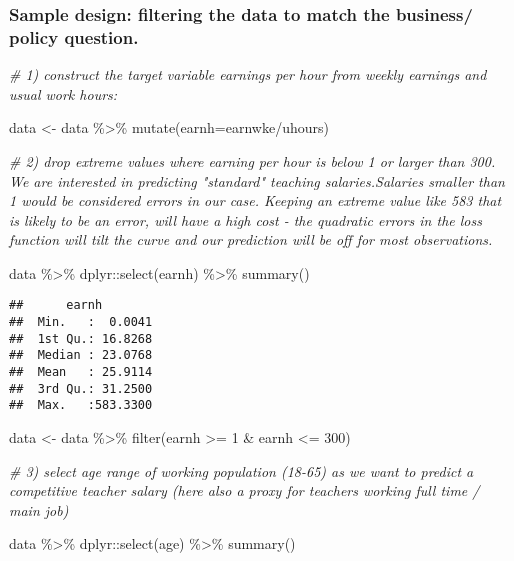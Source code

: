 \documentclass[
]{article}
\newenvironment{Shaded}{\begin{snugshade}}{\end{snugshade}}
\newcommand{\AttributeTok}[1]{\textcolor[rgb]{0.77,0.63,0.00}{#1}}
\newcommand{\CommentTok}[1]{\textcolor[rgb]{0.56,0.35,0.01}{\textit{#1}}}
\newcommand{\DecValTok}[1]{\textcolor[rgb]{0.00,0.00,0.81}{#1}}
\newcommand{\FunctionTok}[1]{\textcolor[rgb]{0.00,0.00,0.00}{#1}}
\newcommand{\NormalTok}[1]{#1}
\newcommand{\OtherTok}[1]{\textcolor[rgb]{0.56,0.35,0.01}{#1}}
\newcommand{\SpecialCharTok}[1]{\textcolor[rgb]{0.00,0.00,0.00}{#1}}
\begin{document}
\hypertarget{sample-design-filtering-the-data-to-match-the-business-policy-question.}{%
\subsubsection{Sample design: filtering the data to match the business/
policy
question.}\label{sample-design-filtering-the-data-to-match-the-business-policy-question.}}

\begin{Shaded}
\begin{Highlighting}[]
\CommentTok{\# 1) construct the target variable earnings per hour from \textquotesingle{}weekly earnings\textquotesingle{} and \textquotesingle{}usual work hours\textquotesingle{}:}

\NormalTok{data }\OtherTok{\textless{}{-}}\NormalTok{ data }\SpecialCharTok{\%\textgreater{}\%} \FunctionTok{mutate}\NormalTok{(}\AttributeTok{earnh=}\NormalTok{earnwke}\SpecialCharTok{/}\NormalTok{uhours)}

                         
\CommentTok{\# 2) drop extreme values where earning per hour is below 1 or larger than 300. We are interested in predicting "standard" teaching salaries.Salaries smaller than 1 would be considered errors in our case. Keeping an extreme value like \textquotesingle{}583\textquotesingle{} that is likely to be an error, will have a high cost {-} the quadratic errors in the loss function will tilt the curve and our prediction will be off for most observations.}

\NormalTok{data }\SpecialCharTok{\%\textgreater{}\%}\NormalTok{ dplyr}\SpecialCharTok{::}\FunctionTok{select}\NormalTok{(earnh) }\SpecialCharTok{\%\textgreater{}\%} \FunctionTok{summary}\NormalTok{()}
\end{Highlighting}
\end{Shaded}

\begin{verbatim}
##      earnh         
##  Min.   :  0.0041  
##  1st Qu.: 16.8268  
##  Median : 23.0768  
##  Mean   : 25.9114  
##  3rd Qu.: 31.2500  
##  Max.   :583.3300
\end{verbatim}

\begin{Shaded}
\begin{Highlighting}[]
\NormalTok{data }\OtherTok{\textless{}{-}}\NormalTok{ data }\SpecialCharTok{\%\textgreater{}\%} \FunctionTok{filter}\NormalTok{(earnh }\SpecialCharTok{\textgreater{}=} \DecValTok{1} \SpecialCharTok{\&}\NormalTok{ earnh }\SpecialCharTok{\textless{}=} \DecValTok{300}\NormalTok{)}

\CommentTok{\# 3) select age range of working population (18{-}65) as we want to predict a competitive teacher salary (here also a proxy for teachers working full time / main job)}

\NormalTok{data }\SpecialCharTok{\%\textgreater{}\%}\NormalTok{ dplyr}\SpecialCharTok{::}\FunctionTok{select}\NormalTok{(age) }\SpecialCharTok{\%\textgreater{}\%} \FunctionTok{summary}\NormalTok{()}
\end{Highlighting}
\end{Shaded}
\end{document}
